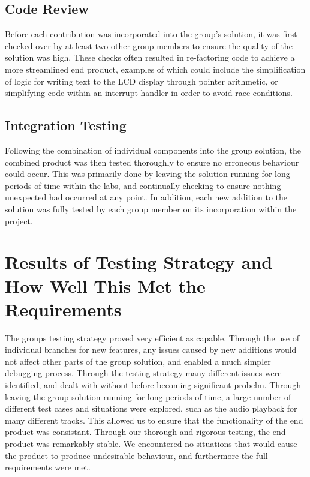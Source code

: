 \subsection*{Code Review}

Before each contribution was incorporated into the group's solution, it was 
first checked over by at least two other group members to ensure the quality of 
the solution was high. These checks often resulted in re-factoring code to 
achieve a more streamlined end product, examples of which could include the 
simplification of logic for writing text to the LCD display through pointer 
arithmetic, or simplifying code within an interrupt handler in order to avoid 
race conditions. 

\subsection*{Integration Testing}

Following the combination of individual components into the group solution, the 
combined product was then tested thoroughly to ensure no erroneous behaviour 
could occur. This was primarily done by leaving the solution running for long 
periods of time within the labs, and continually checking to ensure nothing unexpected 
had occurred at any point.
In addition, each new addition to the solution was fully tested by each group 
member on its incorporation within the project. 

\section{Results of Testing Strategy and How Well This Met the Requirements}

The groups testing strategy proved very efficient as capable. Through the use 
of individual branches for new features, any issues caused by new additions would 
not affect other parts of the group solution, and enabled a much simpler debugging 
process.  
Through the testing strategy many different issues were identified, and dealt 
with without before becoming significant probelm. 
Through leaving the group solution running for long periods of time, a large 
number of different test cases and situations were explored, such as the audio 
playback for many different tracks. This allowed us to ensure that the 
functionality of the end product was consistant.
Through our thorough and rigorous testing, the end product was remarkably stable. 
We encountered no situations that would cause the product to produce undesirable 
behaviour, and furthermore the full requirements were met.

